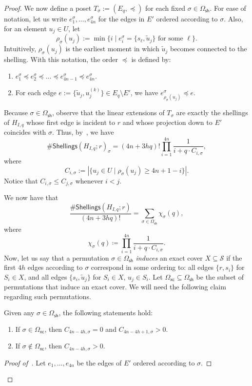 \documentclass[11pt]{amsart}
\newcommand{\ns}{s}
\newcommand{\nou}{\tilde{u}}
\newcommand{\omsh}{\Omega_{\mathsf{sh}}}
\newcommand{\omxc}{\Omega_{\mathsf{xc}}}
\begin{document}
\begin{proof}
We now define a poset $T_{\sigma} := (E_q, \preceq)$ for each fixed $\sigma \in \omsh$. For ease of notation, let us write $e_1^\sigma, \dots, e_{4n}^\sigma$ for the edges in $E'$ ordered according to $\sigma$. Also, for an element $u_j \in U$, let \[
\rho_{\sigma}(u_j) := \min \{ i \mid e_{i}^\sigma = \{\ns_\ell, \nou_j\} \text{ for some } \ell \}.
\]Intuitively, $\rho_{\sigma}(u_j)$  is the earliest moment in which $\nou_j$ becomes connected to the shelling.
With this notation, the order $\preceq$ is defined by:
\begin{enumerate}
    \item $e_1^\sigma \preceq e_2^\sigma \preceq \dots  \preceq e_{4n-1}^\sigma \preceq e_{4n}^\sigma$.
    \item For each edge $e := \{\nou_j, u_j^{(k)}\} \in E_q \setminus E'$, we have $e_{\rho_\sigma(u_j)}^\sigma \preceq e$.
\end{enumerate}
Because $\sigma \in \omsh$, observe that the linear extensions of $T_\sigma$ are exactly the shellings of $H_{I, q}$ whose first edge is incident to $r$ and whose projection down to $E'$ coincides with $\sigma$. Thus, by~, we have
\[
\#\mathsf{Shellings}(H_{I, q}; r)_{\sigma} = (4n+3hq)! \prod_{i=1}^{4n}\frac{1}{i + q \cdot C_{i, \sigma}},
\]
where 
\[ 
C_{i, \sigma} := |\{ u_j \in U \mid   \rho_{\sigma}(u_j) \geq 4n + 1 -i \}|.
\]
Notice that $C_{i, \sigma} \leq C_{j, \sigma}$ whenever $i < j$. 

We now have that
\[
\frac{\#\mathsf{Shellings}(H_{I, q}; r)}{(4n+3hq)!} = \sum_{\sigma \in \omsh} \chi_{\sigma}(q),
\]
where
\[
\chi_{\sigma}(q) \coloneqq \prod_{i=1}^{4n}\frac{1}{i + q \cdot C_{i, \sigma}}.
\]
Now, let us say that a permutation $\sigma \in \omsh$ \emph{induces} an exact cover $X \subseteq \mathcal{S}$ if the first $4h$ edges according to $\sigma$ correspond in some ordering to:
all edges $\{r, \ns_i\}$ for $S_i \in X$, and all edges $\{\ns_i, \nou_j\}$ for $S_i \in X$, $u_j \in S_i$. Let $\omxc \subseteq \omsh$ be the subset of permutations that induce an exact cover. We will need the following claim regarding such permutations.

\begin{claim}\label{claim:cover_characterization}
Given any $\sigma \in \omsh$, the following statements hold:
\begin{enumerate}
\item If $\sigma \in \omxc$, then $C_{4n-4h, \sigma} = 0$ and $C_{4n-4h+1, \sigma} > 0$.
\item If $\sigma \notin \omxc$, then $C_{4n-4h, \sigma} > 0$.
\end{enumerate}
\end{claim}
\begin{proof}[Proof of~]
Let $e_1, \ldots, e_{4n}$ be the edges of $E'$ ordered according to $\sigma$. 


\end{proof}
\end{proof}
\end{document}
